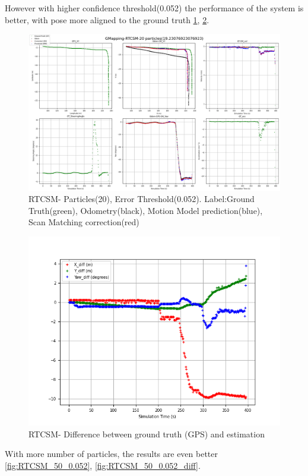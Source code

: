 \clearpage
However with higher confidence threshold(0.052) the performance of the system is better, with pose more aligned to the ground truth \ref{fig:RTCSM_20_0.052}, \ref{fig:RTCSM_20_0.052_diff}.
    \begin{figure}[h] 
        \includegraphics[height=0.6\textwidth]{images/GMapping-RTCSM-20 particles(19.23076923076923)_PositionParameters.png}
        \caption{RTCSM- Particles(20), Error Threshold(0.052). Label:Ground Truth(green), Odometry(black), Motion Model prediction(blue), Scan Matching correction(red)}
        \label{fig:RTCSM_20_0.052}
    \end{figure}
    \begin{figure}[h] 
        \includegraphics[height=0.4\textwidth]{images/GMapping-RTCSM-20 particles(19.23076923076923)_True_vs_Crct.png}
        \caption{RTCSM- Difference between ground truth (GPS) and estimation}
        \label{fig:RTCSM_20_0.052_diff}
    \end{figure}
\clearpage
With more number of particles, the results are even better \ref{fig:RTCSM_50_0.052}, \ref{fig:RTCSM_50_0.052_diff}.
